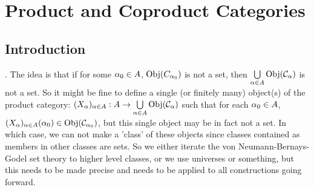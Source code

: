 \documentclass{book}
\begin{document}
	
	
	
	
	
	
	
	
	
	
	
	
	
	
	
	
	
	
	
	
	
	
	
	
	
	
	
	
	
	
	
	
	
	
	
	
	
	
	
	
	
	
	
	
	
	
	
	
	
	
	
	
	
	
	
	
	\newpage
	\section{Product and Coproduct Categories}
	
	\subsection{Introduction}
	
	\begin{note}
		. The idea is that if for some $\alpha_0 \in A$, $\operatorname{Obj}(C_{\alpha_0})$ is not a set, then $\bigcup\limits_{\alpha \in A} \operatorname{Obj}(\mathcal{C}_{\alpha})$ is not a set. So it might be fine to define a single (or finitely many) object(s) of the product category: $(X_{\alpha})_{\alpha \in A}:A \rightarrow \bigcup \limits_{\alpha \in A} \operatorname{Obj}(\mathcal{C}_{\alpha})$ such that for each $\alpha_0 \in A$, $(X_{\alpha})_{\alpha \in A}(\alpha_0) \in \operatorname{Obj}(\mathcal{C}_{\alpha_0})$, but this single object may be in fact not a set. In which case, we can not make a 'class' of these objects since classes contained as members in other classes are sets. So we either iterate the von Neumann-Bernays-Godel set theory to higher level classes, or we use universes or something, but this needs to be made precise and needs to be applied to all constructions going forward.
	\end{note}
	
\end{document}
